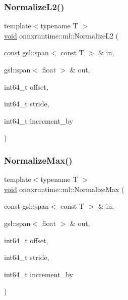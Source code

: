 \mbox{\label{namespaceonnxruntime_1_1ml_ac76638f7a14b53fec05c3a89531dff63}} 
\subsubsection{\texorpdfstring{Normalize\+L2()}{NormalizeL2()}}
{\footnotesize\ttfamily template$<$typename T $>$ \\
\mbox{\hyperlink{mlasi_8h_a88f941d423cb2a819b70a1358982b1a6}{void}} onnxruntime\+::ml\+::\+Normalize\+L2 (\begin{DoxyParamCaption}\item[{const gsl\+::span$<$ const T $>$ \&}]{in,  }\item[{gsl\+::span$<$ float $>$ \&}]{out,  }\item[{int64\+\_\+t}]{offset,  }\item[{int64\+\_\+t}]{stride,  }\item[{int64\+\_\+t}]{increment\+\_\+by }\end{DoxyParamCaption})}

\mbox{\label{namespaceonnxruntime_1_1ml_a139f0b2858ef69c7f042de7e40c3d68e}} 
\subsubsection{\texorpdfstring{Normalize\+Max()}{NormalizeMax()}}
{\footnotesize\ttfamily template$<$typename T $>$ \\
\mbox{\hyperlink{mlasi_8h_a88f941d423cb2a819b70a1358982b1a6}{void}} onnxruntime\+::ml\+::\+Normalize\+Max (\begin{DoxyParamCaption}\item[{const gsl\+::span$<$ const T $>$ \&}]{in,  }\item[{gsl\+::span$<$ float $>$ \&}]{out,  }\item[{int64\+\_\+t}]{offset,  }\item[{int64\+\_\+t}]{stride,  }\item[{int64\+\_\+t}]{increment\+\_\+by }\end{DoxyParamCaption})}

\mbox{\label{namespaceonnxruntime_1_1ml_ae25551d6b51f57889bfdeda0a0a92379}} 

